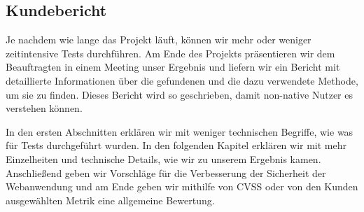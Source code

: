 \subsection{Kundebericht}

Je nachdem wie lange das Projekt läuft, können wir mehr oder weniger zeitintensive Tests durchführen. Am Ende des Projekts präsentieren wir dem Beauftragten in einem Meeting unser Ergebnis und liefern wir ein Bericht mit detaillierte Informationen über die gefundenen  und die dazu verwendete Methode, um sie zu finden. Dieses Bericht wird so geschrieben, damit non-native Nutzer es verstehen können. 

In den ersten Abschnitten erklären wir mit weniger technischen Begriffe, wie was für Tests durchgeführt wurden. In den folgenden Kapitel erklären wir mit mehr Einzelheiten und technische Details, wie wir zu unserem Ergebnis kamen. Anschließend geben wir Vorschläge für die Verbesserung der Sicherheit der Webanwendung und am Ende geben wir mithilfe von \gls{CVSS} oder von den Kunden ausgewählten Metrik eine allgemeine Bewertung.
